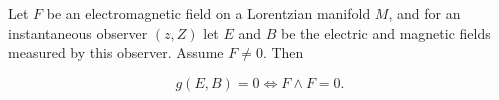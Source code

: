 Let $F$ be an electromagnetic field on a Lorentzian manifold $M$, and for an instantaneous observer $(z, Z)$ let $E$ and $B$ be the electric and magnetic fields measured by this observer. Assume $F \neq 0$. Then

$$g(E, B) = 0 \iff F \wedge F = 0.$$
